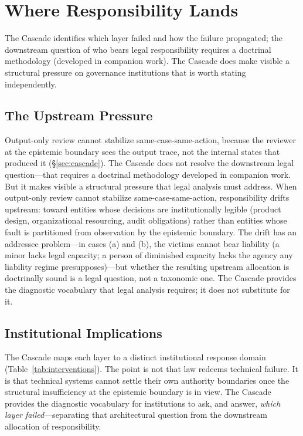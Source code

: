 \documentclass[11pt]{article}
\begin{document}
\section{Where Responsibility Lands}\label{sec:responsibility}

The Cascade identifies which layer failed and how the failure propagated; the downstream question of who bears legal responsibility requires a doctrinal methodology (developed in companion work). The Cascade does make visible a structural pressure on governance institutions that is worth stating independently.

\subsection{The Upstream Pressure}

Output-only review cannot stabilize same-case-same-action, because the reviewer at the epistemic boundary sees the output trace, not the internal states that produced it (\S\ref{sec:cascade}). The Cascade does not resolve the downstream legal question---that requires a doctrinal methodology developed in companion work. But it makes visible a structural pressure that legal analysis must address. When output-only review cannot stabilize same-case-same-action, responsibility drifts upstream: toward entities whose decisions are institutionally legible (product design, organizational resourcing, audit obligations) rather than entities whose fault is partitioned from observation by the epistemic boundary. The drift has an addressee problem---in cases (a) and (b), the victims cannot bear liability (a minor lacks legal capacity; a person of diminished capacity lacks the agency any liability regime presupposes)---but whether the resulting upstream allocation is doctrinally sound is a legal question, not a taxonomic one. The Cascade provides the diagnostic vocabulary that legal analysis requires; it does not substitute for it.

\subsection{Institutional Implications}

The Cascade maps each layer to a distinct institutional response domain (Table~\ref{tab:interventions}). The point is not that law redeems technical failure. It is that technical systems cannot settle their own authority boundaries once the structural insufficiency at the epistemic boundary is in view. The Cascade provides the diagnostic vocabulary for institutions to ask, and answer, \textit{which layer failed}---separating that architectural question from the downstream allocation of responsibility.
\end{document}
